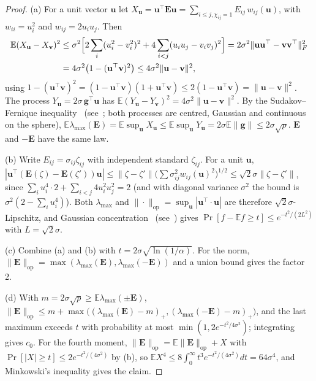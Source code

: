 \documentclass[11pt]{article}
\theoremstyle{definition}
\theoremstyle{plain}
\newcommand{\Ex}{\mathbb{E}}
\newcommand{\bE}{\mathbf{E}}
\newcommand{\bg}{\mathbf{g}}
\newcommand{\bu}{\mathbf{u}}
\newcommand{\bv}{\mathbf{v}}
\newcommand{\lmax}{\lambda_{\max}}
\newcommand{\op}{\mathrm{op}}
\begin{document}
\begin{proof}
(a) For a unit vector $\bu$ let $X_\bu=\bu^\top\bE\bu=\sum_{i\le j,\chi_{ij}=1}E_{ij}\,w_{ij}(\bu)$, with $w_{ii}=u_i^2$ and $w_{ij}=2u_iu_j$. Then
\begin{align*}
  \Ex(X_\bu-X_\bv)^2&\le\sigma^2\Bigl[2\sum_i(u_i^2-v_i^2)^2+4\sum_{i<j}(u_iu_j-v_iv_j)^2\Bigr]=2\sigma^2\|\bu\bu^\top-\bv\bv^\top\|_F^2\\
  &=4\sigma^2\bigl(1-(\bu^\top\bv)^2\bigr)\le4\sigma^2\|\bu-\bv\|^2,
\end{align*}
using $1-(\bu^\top\bv)^2=(1-\bu^\top\bv)(1+\bu^\top\bv)\le2(1-\bu^\top\bv)=\|\bu-\bv\|^2$. The process $Y_\bu=2\sigma\,\bg^\top\bu$ has $\Ex(Y_\bu-Y_\bv)^2=4\sigma^2\|\bu-\bv\|^2$. By the Sudakov--Fernique inequality~\cite{Sudakov71,Fernique75} (see~\cite[Thm.~7.2.11]{Vershynin18}; both processes are centred, Gaussian and continuous on the sphere), $\Ex\lmax(\bE)=\Ex\sup_\bu X_\bu\le\Ex\sup_\bu Y_\bu=2\sigma\Ex\|\bg\|\le2\sigma\sqrt p$. $\bE$ and $-\bE$ have the same law.

(b) Write $E_{ij}=\sigma_{ij}\zeta_{ij}$ with independent standard $\zeta_{ij}$. For a unit $\bu$, $|\bu^\top(\bE(\zeta)-\bE(\zeta'))\bu|\le\|\zeta-\zeta'\|\bigl(\sum\sigma_{ij}^2w_{ij}(\bu)^2\bigr)^{1/2}\le\sqrt2\sigma\|\zeta-\zeta'\|$, since $\sum_iu_i^4\cdot2+\sum_{i<j}4u_i^2u_j^2=2$ (and with diagonal variance $\sigma^2$ the bound is $\sigma^2(2-\sum_iu_i^4)$). Both $\lmax$ and $\|\cdot\|_\op=\sup_\bu|\bu^\top\cdot\bu|$ are therefore $\sqrt2\sigma$-Lipschitz, and Gaussian concentration~\cite{TIS76} (see~\cite[Thm.~5.6]{BLM13}) gives $\Pr[f-\Ex f\ge t]\le e^{-t^2/(2L^2)}$ with $L=\sqrt2\sigma$.

(c) Combine (a) and (b) with $t=2\sigma\sqrt{\ln(1/\alpha)}$. For the norm, $\|\bE\|_\op=\max(\lmax(\bE),\lmax(-\bE))$ and a union bound gives the factor 2.

(d) With $m=2\sigma\sqrt p\ge\Ex\lmax(\pm\bE)$, $\|\bE\|_\op\le m+\max\bigl((\lmax(\bE)-m)_+,(\lmax(-\bE)-m)_+\bigr)$, and the last maximum exceeds $t$ with probability at most $\min(1,2e^{-t^2/4\sigma^2})$; integrating gives $c_0$. For the fourth moment, $\|\bE\|_\op=\Ex\|\bE\|_\op+X$ with $\Pr[|X|\ge t]\le2e^{-t^2/(4\sigma^2)}$ by (b), so $\Ex X^4\le8\int_0^\infty t^3e^{-t^2/(4\sigma^2)}dt=64\sigma^4$, and Minkowski's inequality gives the claim.
\end{proof}
\end{document}

